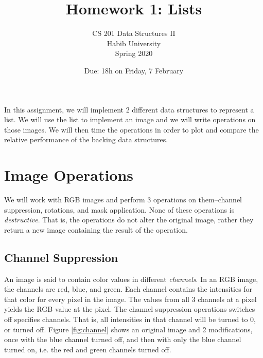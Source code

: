 \documentclass[addpoints]{exam}
\title{Homework 1: Lists}
\author{CS 201 Data Structures II\\Habib University\\Spring 2020}
\date{Due: 18h on Friday, 7 February}
\begin{document}
\maketitle

In this assignment, we will implement 2 different data structures to represent a list. We will use the list to implement an image and we will write operations on those images. We will then time the operations in order to plot and compare the relative performance of the backing data structures.

\section{Image Operations}
\label{sec:imgops}

We will work with RGB images and perform 3 operations on them--channel suppression, rotations, and mask application. None of these operations is \textit{destructive}. That is, the operations do not alter the original image, rather they return a new image containing the result of the operation.

\subsection{Channel Suppression}

An image is said to contain color values in different \textit{channels}. In an RGB image, the channels are red, blue, and green. Each channel contains the intensities for that color for every pixel in the image. The values from all 3 channels at a pixel yields the RGB value at the pixel. The channel suppression operations switches off specifies channels. That is, all intensities in that channel will be turned to 0, or turned off. Figure \ref{fig:channel} shows an original image and 2 modifications, once with the blue channel turned off, and then with only the blue channel turned on, i.e. the red and green channels turned off.
\end{document}
